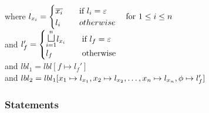         {}
        {}
        {where $l_{x_i} = \begin{cases}
          \overline{x_i} & \quad \text{if } l_i = \varepsilon \\
          l_i & \quad otherwise
        \end{cases}\quad \text{for } 1 \leq i \leq n$ \\
          and $l_f' = \begin{cases}
            \mathlarger\sqcupl_{i = 1}^n l_{x_i} & \quad \text{if } l_f = \varepsilon \\
            l_f & \quad \text{otherwise}
        \end{cases}$ \\
          and $lbl_1 = lbl[f \mapsto l_f']$ \\
          and $lbl_2 = lbl_1[x_1 \mapsto l_{x_1}, x_2 \mapsto l_{x_2}, \dots, x_n \mapsto l_{x_n}, \phi \mapsto l_f']$}

\subsubsection{Statements}

